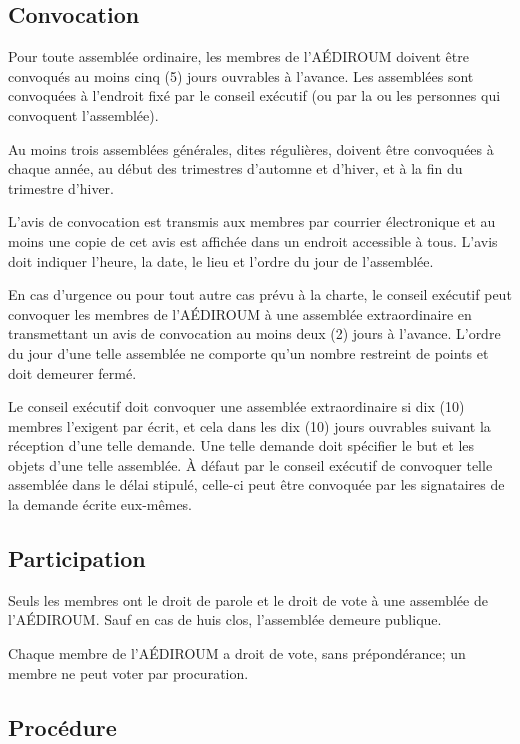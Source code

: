 \documentclass{aediroum}
\begin{document}
\subsection{Convocation}\label{sec:convocation-generale}

Pour toute assemblée ordinaire, les membres de l'AÉDIROUM doivent être convoqués au moins cinq (5) jours ouvrables à l'avance. Les assemblées sont convoquées à l'endroit fixé par le conseil exécutif (ou par la ou les personnes qui convoquent l'assemblée).

Au moins trois assemblées générales, dites régulières, doivent être convoquées à chaque année, au début des trimestres d'automne et d'hiver, et à la fin du trimestre d'hiver.

L'avis de convocation est transmis aux membres par courrier électronique et au moins une copie de cet avis est affichée dans un endroit accessible à tous. L'avis doit indiquer l'heure, la date, le lieu et l'ordre du jour de l'assemblée.

En cas d'urgence ou pour tout autre cas prévu à la charte, le conseil exécutif peut convoquer les membres de l'AÉDIROUM à une assemblée extraordinaire en transmettant un avis de convocation au moins deux (2) jours à l'avance. L'ordre du jour d'une telle assemblée ne comporte qu'un nombre restreint de points et doit demeurer fermé.

Le conseil exécutif doit convoquer une assemblée extraordinaire si dix (10) membres l'exigent par écrit, et cela dans les dix (10) jours ouvrables suivant la réception d'une telle demande. Une telle demande doit spécifier le but et les objets d'une telle assemblée. À défaut par le conseil exécutif de convoquer telle assemblée dans le délai stipulé, celle-ci peut être convoquée par les signataires de la demande écrite eux-mêmes.

\subsection{Participation}\label{sec:participation}

Seuls les membres ont le droit de parole et le droit de vote à une assemblée de l'AÉDIROUM. Sauf en cas de huis clos, l'assemblée demeure publique.

Chaque membre de l'AÉDIROUM a droit de vote, sans prépondérance; un membre ne peut voter par procuration.

\subsection{Procédure}\label{sec:procedure-generale}
\end{document}
